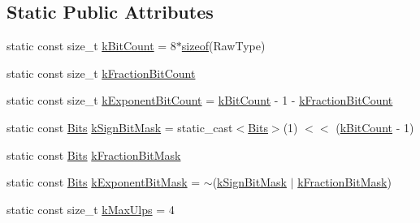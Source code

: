 \subsection*{Static Public Attributes}
\begin{DoxyCompactItemize}
\item 
static const size\+\_\+t \hyperlink{classtesting_1_1internal_1_1_floating_point_ab819d2e8f93e9e482373999f0f8d71b9}{k\+Bit\+Count} = 8$\ast$\hyperlink{classes__2_8js_a47ca7968904a6cccd03bb34c994adc04}{sizeof}(Raw\+Type)
\item 
static const size\+\_\+t \hyperlink{classtesting_1_1internal_1_1_floating_point_a0b756a6d2a4f5f5b41ca79651c06c043}{k\+Fraction\+Bit\+Count}
\item 
static const size\+\_\+t \hyperlink{classtesting_1_1internal_1_1_floating_point_a1973d843c00781053d3073daa8a40119}{k\+Exponent\+Bit\+Count} = \hyperlink{classtesting_1_1internal_1_1_floating_point_ab819d2e8f93e9e482373999f0f8d71b9}{k\+Bit\+Count} -\/ 1 -\/ \hyperlink{classtesting_1_1internal_1_1_floating_point_a0b756a6d2a4f5f5b41ca79651c06c043}{k\+Fraction\+Bit\+Count}
\item 
static const \hyperlink{classtesting_1_1internal_1_1_floating_point_abf228bf6cd48f12c8b44c85b4971a731}{Bits} \hyperlink{classtesting_1_1internal_1_1_floating_point_aca98b5ea6f2222a66a82e52421682efa}{k\+Sign\+Bit\+Mask} = static\+\_\+cast$<$\hyperlink{classtesting_1_1internal_1_1_floating_point_abf228bf6cd48f12c8b44c85b4971a731}{Bits}$>$(1) $<$$<$ (\hyperlink{classtesting_1_1internal_1_1_floating_point_ab819d2e8f93e9e482373999f0f8d71b9}{k\+Bit\+Count} -\/ 1)
\item 
static const \hyperlink{classtesting_1_1internal_1_1_floating_point_abf228bf6cd48f12c8b44c85b4971a731}{Bits} \hyperlink{classtesting_1_1internal_1_1_floating_point_a0ac75d4ffd24f14bca452abe8a718da1}{k\+Fraction\+Bit\+Mask}
\item 
static const \hyperlink{classtesting_1_1internal_1_1_floating_point_abf228bf6cd48f12c8b44c85b4971a731}{Bits} \hyperlink{classtesting_1_1internal_1_1_floating_point_a66065dfc4d5f41100f686159637af23b}{k\+Exponent\+Bit\+Mask} = $\sim$(\hyperlink{classtesting_1_1internal_1_1_floating_point_aca98b5ea6f2222a66a82e52421682efa}{k\+Sign\+Bit\+Mask} $\vert$ \hyperlink{classtesting_1_1internal_1_1_floating_point_a0ac75d4ffd24f14bca452abe8a718da1}{k\+Fraction\+Bit\+Mask})
\item 
static const size\+\_\+t \hyperlink{classtesting_1_1internal_1_1_floating_point_aac498b3714d93f8e88cdc30e4c5935f6}{k\+Max\+Ulps} = 4
\end{DoxyCompactItemize}


